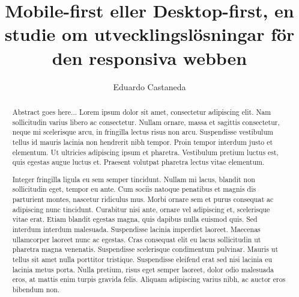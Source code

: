 \documentclass[11pt]{article}
\title{Mobile-first eller Desktop-first, en studie om utvecklingslösningar för den responsiva webben}
\author{Eduardo Castaneda}
\begin{document}
\maketitle
\thispagestyle{empty}


\newpage

\begin{abstract}
Abstract goes here... Lorem ipsum dolor sit amet, consectetur adipiscing elit. Nam sollicitudin varius libero ac consectetur. Nullam ornare, massa et sagittis consectetur, neque mi scelerisque arcu, in fringilla lectus risus non arcu. Suspendisse vestibulum tellus id mauris lacinia non hendrerit nibh tempor. Proin tempor interdum justo et elementum. Ut ultricies adipiscing ipsum et pharetra. Vestibulum pretium luctus est, quis egestas augue luctus et. Praesent volutpat pharetra lectus vitae elementum.

Integer fringilla ligula eu sem semper tincidunt. Nullam mi lacus, blandit non sollicitudin eget, tempor eu ante. Cum sociis natoque penatibus et magnis dis parturient montes, nascetur ridiculus mus. Morbi ornare sem et purus consequat ac adipiscing nunc tincidunt. Curabitur nisi ante, ornare vel adipiscing et, scelerisque vitae erat. Etiam blandit egestas magna, quis dapibus nulla euismod quis. Sed interdum interdum malesuada. Suspendisse lacinia imperdiet laoreet. Maecenas ullamcorper laoreet nunc ac egestas. Cras consequat elit eu lacus sollicitudin ut pharetra magna venenatis. Suspendisse scelerisque condimentum pulvinar. Mauris ut tellus sit amet nulla porttitor tristique. Suspendisse eleifend erat sed nisi lacinia eu lacinia metus porta. Nulla pretium, risus eget semper laoreet, dolor odio malesuada eros, at mattis enim turpis gravida felis. Aliquam adipiscing varius nibh, ac auctor eros bibendum non.
\end{abstract}
\thispagestyle{empty}

\newpage
\tableofcontents

\newpage
\end{document}
